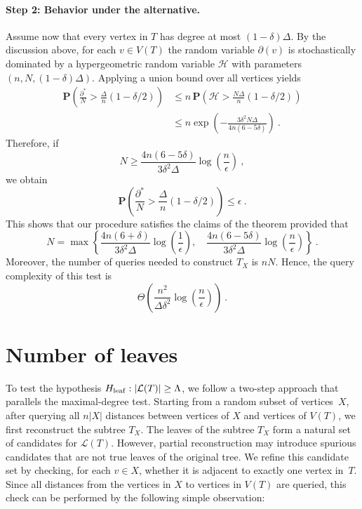 \documentclass[12pt]{article}
\newcommand{\prob}[1]{\mathbf{P}\left( #1 \right)}
\newcommand{\degree}{\partial}
\begin{document}
\paragraph{Step 2: Behavior under the alternative.}
Assume now that  every vertex in $T$ has degree at most $(1-\delta)\Delta$.
By the discussion above, for each $v\in V(T)$ the random variable $\degree(v)$
is stochastically dominated by a hypergeometric random variable $\mathcal{H}$
with parameters $(n,N,(1-\delta)\Delta)$.
Applying a union bound over all vertices yields
\begin{align*}
\prob{
\frac{\degree^*}{N}
>
\frac{\Delta}{n}(1-\delta/2)}
&\le
n\,\prob{
\mathcal{H}
>
\frac{N\Delta}{n}(1-\delta/2)} \\
&\le
n\exp\!\left(
-\frac{3\delta^2N\Delta}{4n(6-5\delta)}
\right)~.
\end{align*}
Therefore, if
\[
N \ge
\frac{4n(6-5\delta)}{3\delta^2\Delta}
\log\!\left(\frac{n}{\epsilon}\right)~,
\]
we obtain
\[
\prob{
\frac{\degree^*}{N}
>
\frac{\Delta}{n}(1-\delta/2)}
\le
\epsilon~.
\]
This shows that our procedure satisfies the claims of the theorem provided that
\[
N = \max\left\{
\frac{4n(6+\delta)}{3\delta^2\Delta}\log\!\left(\frac{1}{\epsilon}\right),
\quad
\frac{4n(6 - 5\delta)}{3\delta^{2}\Delta} \log\!\left(\frac{n}{\epsilon}\right)
\right\}~.
\]
Moreover, the number of queries needed to construct $T_X$ is $nN$. 
Hence, the query complexity of this test is 
\[
\Theta\!\left( \frac{n^2}{\Delta \delta^2}\log\!\left(\frac{n}{\epsilon}\right) \right)~.
\]






\section{Number of leaves}\label{sec: testing leaves}
To test the hypothesis $H_{\rm leaf}: |\mathcal{L}(T)| \ge \Lambda$, we follow a two-step approach
that parallels the maximal-degree test.
Starting from a random subset of vertices~$X$, 
after querying all $n|X|$ distances between vertices of $X$ and vertices of $V(T)$, we first reconstruct the
subtree $T_X$. The leaves of the subtree $T_X$ form a natural set of candidates for $\mathcal{L}(T)$.
However, partial reconstruction may introduce spurious candidates that are
not true leaves of the original tree.
We refine this candidate set by checking, for each $v\in X$,
whether it is adjacent to exactly one vertex in~$T$.
Since all distances from the vertices in $X$ to vertices in $V(T)$ are queried, this check can be performed by the following simple observation:
\end{document}
